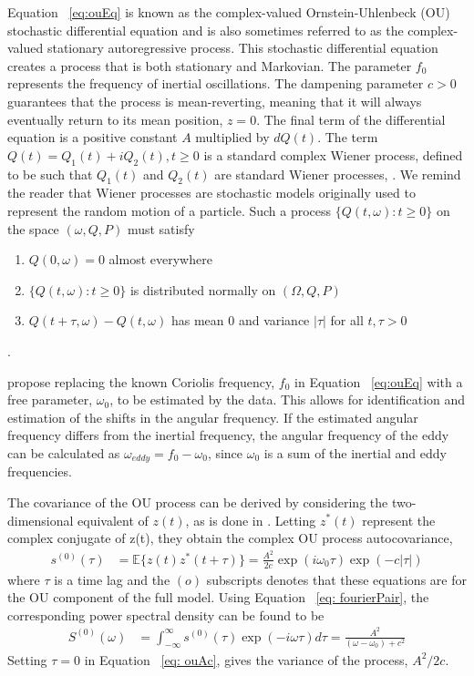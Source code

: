 \documentclass{stat572Style}
\begin{document}
Equation ~\ref{eq:ouEq}  is known as the complex-valued Ornstein-Uhlenbeck (OU) stochastic differential equation and is also sometimes referred to as the complex-valued stationary autoregressive process. This stochastic differential equation creates a process  that is both stationary and Markovian. The parameter $f_{0}$ represents the frequency of inertial oscillations. The dampening parameter $c > 0$  guarantees that the process is mean-reverting, meaning that it will always eventually return to its mean position, $z = 0$.   The final term of the differential equation is a positive constant $A$ multiplied by $dQ(t)$.  The term $Q(t) = Q_{1}(t) + i Q_{2}(t), t \geq 0$ is a standard complex Wiener process, defined to be such that $Q_{1}(t)$ and $Q_{2}(t)$ are standard Wiener processes, . We remind the reader that Wiener processes are stochastic models originally used to represent the random motion of a particle. Such a process $\{Q(t, \omega): t \geq 0\}$ on the space $(\omega, Q, P)$ must satisfy
\begin{enumerate}
\item $Q(0, \omega) = 0$ almost everywhere
\item $\{Q(t, \omega): t \geq 0\}$ is distributed normally on $(\Omega,Q, P)$
\item $Q(t + \tau, \omega) - Q(t, \omega)$ has mean 0 and variance $|\tau|$ for all $t, \tau > 0$
\end{enumerate}
\citep{Hida1980}. 

\citet{Sykulski2016} propose replacing the known Coriolis frequency, $f_{0}$  in Equation ~\ref{eq:ouEq} with  a free parameter, $\omega_{0}$, to be estimated by the data. This allows for identification and estimation of the shifts in the angular frequency. If the estimated angular frequency differs from the inertial frequency, the angular frequency of the eddy can be calculated as $\omega_{eddy} = f_{0} - \omega_{0}$, since $\omega_{0}$ is a sum of the inertial and eddy frequencies.


The covariance of the OU process can be derived by considering the two-dimensional equivalent of $z(t)$, as is done in  \citet{Arato1999}. Letting $z^{*}(t)$ represent the complex conjugate of z(t), they obtain the complex OU process autocovariance,
\begin{align}
\label{eq:ouAC}
s^{(0)}(\tau) &= \mathbb{E}\{z(t)z^{*}(t + \tau) \} = \frac{A^{2}}{2c} \exp(i \omega_{0}\tau) \exp(-c|\tau|)
\end{align}
where $\tau$ is a time lag and the $(o)$ subscripts denotes that these equations are for the OU component of the full model.  Using Equation ~\ref{eq: fourierPair}, the corresponding power spectral density can be found to be\begin{align}
\label{eq:ouPSD}
S^{(0)}(\omega) &= \int_{-\infty}^{\infty} s^{(0)}(\tau) \exp (-i \omega \tau) d \tau = \frac{A^{2}}{(\omega - \omega_{0}) + c^{2}}
\end{align}
\noindent Setting $\tau = 0$ in Equation ~\ref{eq: ouAc}, gives the variance of the process, $A^{2}/2c$.
\end{document}
